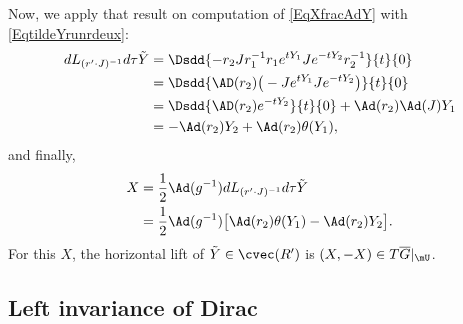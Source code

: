 Now, we apply that result on computation of \eqref{EqXfracAdY} with \eqref{EqtildeYrunrdeux}:
\begin{align*}
dL_{(r'\cdot J)^{-1}}d\tau\tilde Y&=\Dsdd{ -r_2Jr_1^{-1}r_1 e^{tY_{1}}J e^{-tY_{2}}r_2^{-1} }{t}{0}\\
        &=\Dsdd{ \AD(r_2)\big( -J e^{tY_{1}}J e^{-tY_{2}} \big) }{t}{0}\\
        &=\Dsdd{ \AD(r_2) e^{-tY_{2}} }{t}{0}+\Ad(r_2)\Ad(J)Y_{1}\\
        &=-\Ad(r_2)Y_{2}+\Ad(r_2)\theta(Y_{1}),
\end{align*}
and finally,
\begin{equation}  \label{EqValeurXAdtheta}
\begin{aligned}
X&=\frac{ 1 }{2}\Ad(g^{-1})dL_{(r'\cdot J)^{-1}}d\tau\tilde Y\\
        &=\frac{ 1 }{2}\Ad(g^{-1})\big[ \Ad(r_2)\theta(Y_{1})-\Ad(r_2)Y_{2} \big].
\end{aligned}
\end{equation}
For this $X$, the horizontal lift of $\tilde Y\in\cvec(R')$ is $(X,-X)\in T\overline{G}|_{\mU}$.

\subsection{Left invariance of Dirac}


